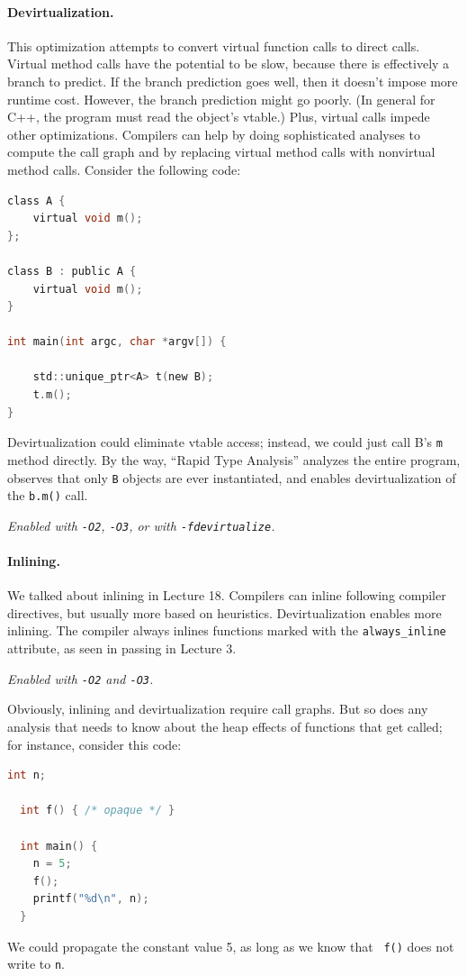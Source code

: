 \documentclass[a4paper]{report}
\begin{document}
\paragraph{Devirtualization.} This optimization attempts to convert
virtual function calls to direct calls.  Virtual method calls have the
potential to be slow, because there is effectively a branch to
predict. If the branch prediction goes well, then it doesn't impose
more runtime cost. However, the branch prediction might go poorly.  (In
general for C++, the program must read the object's vtable.) Plus, virtual
calls impede other optimizations. Compilers can help by doing
sophisticated analyses to compute the call graph and by replacing
virtual method calls with nonvirtual method calls.  Consider the
following code:
  \begin{lstlisting}[language=C]
class A {
    virtual void m();
};

class B : public A {
    virtual void m();
}

int main(int argc, char *argv[]) {

    std::unique_ptr<A> t(new B);
    t.m();
}
  \end{lstlisting}
Devirtualization could eliminate vtable access; instead, we could just call B's {\tt m} method
directly. By the way, ``Rapid Type Analysis'' analyzes the entire program, observes that
only {\tt B} objects are ever instantiated, and enables devirtualization
of the {\tt b.m()} call.

\noindent \emph{Enabled with {\tt -O2}, {\tt -O3}, or with {\tt -fdevirtualize}.}

\paragraph{Inlining.} We talked about inlining in Lecture 18. Compilers can inline following compiler directives, but usually more based on heuristics. Devirtualization enables more inlining. The compiler always inlines functions marked with the {\tt always\_inline} attribute, as seen in passing in Lecture 3.

\noindent \emph{Enabled with {\tt -O2} and {\tt -O3}.}

Obviously, inlining and devirtualization require call graphs. But so
does any analysis that needs to know about the heap effects of
functions that get called; for instance, consider this code:

{\small
\begin{lstlisting}[language=C]
  int n;

  int f() { /* opaque */ }

  int main() {
    n = 5;
    f();
    printf("%d\n", n);
  }
\end{lstlisting}
}
We could propagate the constant value 5, as long as we know that {\tt
  f()} does not write to {\tt n}.
\end{document}
